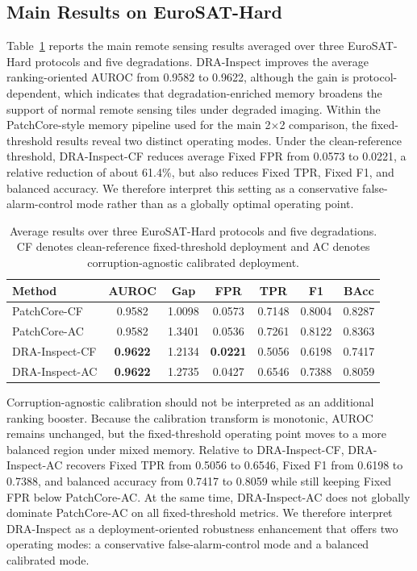 \documentclass[remotesensing,article,submit,pdftex,moreauthors]{Definitions/mdpi}
\begin{document}
\subsection{Main Results on EuroSAT-Hard}
Table~\ref{tab:eurosat-hard-main} reports the main remote sensing results averaged over three EuroSAT-Hard protocols and five degradations. DRA-Inspect improves the average ranking-oriented AUROC from 0.9582 to 0.9622, although the gain is protocol-dependent, which indicates that degradation-enriched memory broadens the support of normal remote sensing tiles under degraded imaging. Within the PatchCore-style memory pipeline used for the main 2$\times$2 comparison, the fixed-threshold results reveal two distinct operating modes. Under the clean-reference threshold, DRA-Inspect-CF reduces average Fixed FPR from 0.0573 to 0.0221, a relative reduction of about 61.4\%, but also reduces Fixed TPR, Fixed F1, and balanced accuracy. We therefore interpret this setting as a conservative false-alarm-control mode rather than as a globally optimal operating point.

\begin{table}[!htbp]
\caption{Average results over three EuroSAT-Hard protocols and five degradations. CF denotes clean-reference fixed-threshold deployment and AC denotes corruption-agnostic calibrated deployment.}
\label{tab:eurosat-hard-main}
\centering
\small
\setlength{\tabcolsep}{4pt}
\begin{tabular}{lcccccc}
\hline
Method & AUROC & Gap & FPR & TPR & F1 & BAcc \\
\hline
PatchCore-CF & 0.9582 & 1.0098 & 0.0573 & 0.7148 & 0.8004 & 0.8287 \\
PatchCore-AC & 0.9582 & 1.3401 & 0.0536 & 0.7261 & 0.8122 & 0.8363 \\
DRA-Inspect-CF & \textbf{0.9622} & 1.2134 & \textbf{0.0221} & 0.5056 & 0.6198 & 0.7417 \\
DRA-Inspect-AC & \textbf{0.9622} & 1.2735 & 0.0427 & 0.6546 & 0.7388 & 0.8059 \\
\hline
\end{tabular}
\end{table}

\noindent Corruption-agnostic calibration should not be interpreted as an additional ranking booster. Because the calibration transform is monotonic, AUROC remains unchanged, but the fixed-threshold operating point moves to a more balanced region under mixed memory. Relative to DRA-Inspect-CF, DRA-Inspect-AC recovers Fixed TPR from 0.5056 to 0.6546, Fixed F1 from 0.6198 to 0.7388, and balanced accuracy from 0.7417 to 0.8059 while still keeping Fixed FPR below PatchCore-AC. At the same time, DRA-Inspect-AC does not globally dominate PatchCore-AC on all fixed-threshold metrics. We therefore interpret DRA-Inspect as a deployment-oriented robustness enhancement that offers two operating modes: a conservative false-alarm-control mode and a balanced calibrated mode.
\end{document}
